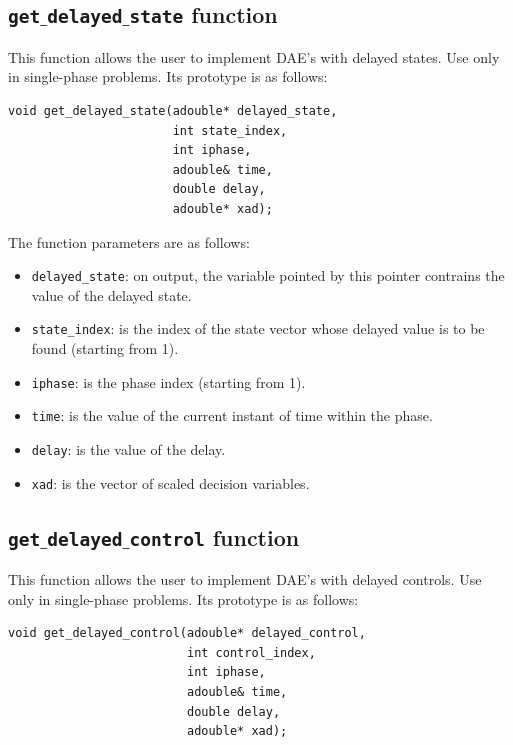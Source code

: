 \documentclass[a4paper,11pt]{report}    %
\begin{document}
\subsection{ \texttt{get$\_$delayed$\_$state} function}

This function allows the user to implement DAE's with delayed
states. Use only in single-phase problems. Its prototype is as follows:

\begin{verbatim}
void get_delayed_state(adouble* delayed_state, 
                       int state_index, 
                       int iphase, 
                       adouble& time, 
                       double delay, 
                       adouble* xad);
\end{verbatim}

The function parameters are as follows:

\begin{itemize}
 \item \verb|delayed_state|: on output, the variable pointed by this pointer contrains the value of the delayed state.
 \item \verb|state_index|:    is the index of the state vector whose delayed value is to be found (starting from 1).
 \item \verb|iphase|:  is the phase index (starting from 1).
 \item \verb|time|:  is the value of the current instant of time within the phase.
 \item \verb|delay|:  is the value of the delay.
 \item \verb|xad|: is the vector of scaled decision variables.
\end{itemize}



\subsection{ \texttt{get$\_$delayed$\_$control} function}

This function allows the user to implement DAE's with delayed
controls. Use only in single-phase problems. Its prototype is as follows:

\begin{verbatim}
void get_delayed_control(adouble* delayed_control, 
                         int control_index, 
                         int iphase, 
                         adouble& time, 
                         double delay, 
                         adouble* xad);
\end{verbatim}
\end{document}
